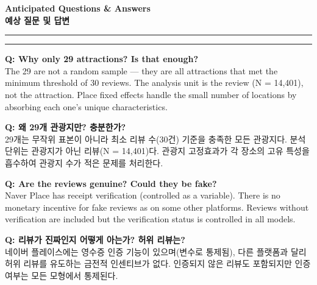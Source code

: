 \documentclass[10pt,a4paper]{article}
\begin{document}
\clearpage

\begin{center}
  {\large\bfseries Anticipated Questions \& Answers}\\[2pt]
  {\large\bfseries 예상 질문 및 답변}
\end{center}
\rule{\linewidth}{0.8pt}\vspace{4pt}

\newcommand{\qa}[4]{%
  \noindent%
  \begin{minipage}[t]{0.485\linewidth}
    \small\textbf{Q: #1}\\[3pt] #2
  \end{minipage}\hfill\vrule\hfill%
  \begin{minipage}[t]{0.483\linewidth}
    \small\textbf{Q: #3}\\[3pt] #4
  \end{minipage}\par\vspace{8pt}%
}

\par
\vspace{2pt}\rule{\linewidth}{0.3pt}\vspace{4pt}

\qa{Why only 29 attractions? Is that enough?}{%
The 29 are not a random sample --- they are all attractions that met the minimum threshold of 30 reviews. The analysis unit is the review (N = 14,401), not the attraction. Place fixed effects handle the small number of locations by absorbing each one's unique characteristics.
}{왜 29개 관광지만? 충분한가?}{%
29개는 무작위 표본이 아니라 최소 리뷰 수(30건) 기준을 충족한 모든 관광지다. 분석 단위는 관광지가 아닌 리뷰(N = 14,401)다. 관광지 고정효과가 각 장소의 고유 특성을 흡수하여 관광지 수가 적은 문제를 처리한다.
}

\qa{Are the reviews genuine? Could they be fake?}{%
Naver Place has receipt verification (controlled as a variable). There is no monetary incentive for fake reviews as on some other platforms. Reviews without verification are included but the verification status is controlled in all models.
}{리뷰가 진짜인지 어떻게 아는가? 허위 리뷰는?}{%
네이버 플레이스에는 영수증 인증 기능이 있으며(변수로 통제됨), 다른 플랫폼과 달리 허위 리뷰를 유도하는 금전적 인센티브가 없다. 인증되지 않은 리뷰도 포함되지만 인증 여부는 모든 모형에서 통제된다.
}
\end{document}

